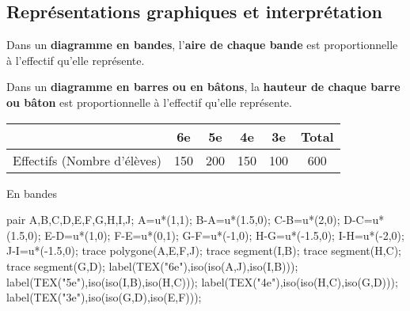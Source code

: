 \begin{changemargin}{0mm}{-15mm}
    \section{Représentations graphiques et interprétation}
    
    \begin{definition}
        Dans un \textbf{diagramme en bandes}, l'\textbf{aire de chaque bande} est proportionnelle à l'effectif qu'elle représente.
    \end{definition}
    \begin{definition}
        Dans un \textbf{diagramme en barres ou en bâtons}, la \textbf{hauteur de chaque barre ou bâton} est proportionnelle à l'effectif qu'elle représente.
    \end{definition}
    \begin{exemples*1}
        \begin{center}
            \begin{tabular}{|c|c|c|c|c|c|}
                \cline{2-6}
                \multicolumn{1}{c|}{}&6e&5e&4e&3e&Total\\
                \hline
                Effectifs (Nombre d'élèves)&150&200&150&100&600\\
                \hline
            \end{tabular}
        
            \medskip
            En bandes\\\smallskip
            \begin{Geometrie}
                pair A,B,C,D,E,F,G,H,I,J;
                A=u*(1,1);
                B-A=u*(1.5,0);
                C-B=u*(2,0);
                D-C=u*(1.5,0);
                E-D=u*(1,0);
                F-E=u*(0,1);
                G-F=u*(-1,0);
                H-G=u*(-1.5,0);
                I-H=u*(-2,0);
                J-I=u*(-1.5,0);
                trace polygone(A,E,F,J);
                trace segment(I,B);
                trace segment(H,C);
                trace segment(G,D);
                label(TEX("6e"),iso(iso(A,J),iso(I,B)));
                label(TEX("5e"),iso(iso(I,B),iso(H,C)));
                label(TEX("4e"),iso(iso(H,C),iso(G,D)));
                label(TEX("3e"),iso(iso(G,D),iso(E,F)));
            \end{Geometrie}
            

\end{center}
\end{exemples*1}
\end{changemargin}
